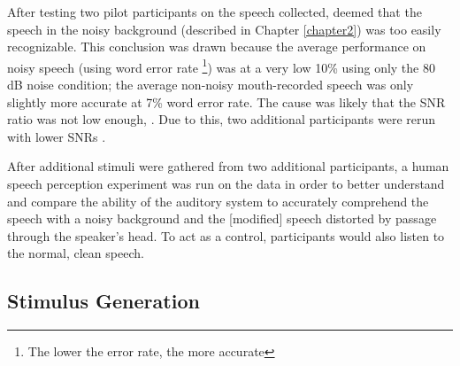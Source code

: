 After testing two pilot participants on the speech collected, \DIFdelbegin {}\DIFdelend \DIFaddbegin {}\DIFaddend deemed that the speech in the noisy background (described in Chapter \DIFdelbegin {}\DIFdelend \ref{chapter2}) was too easily recognizable.  This conclusion was drawn because the average performance on noisy speech (using word error rate \DIFaddbegin {}\DIFaddend \footnote{The lower the error rate, the more accurate}) was at a very low 10\% using only the 80 dB noise condition; the average non-noisy mouth-recorded speech was only slightly more accurate at 7\% word error rate. The cause was likely that the SNR ratio was not low enough, \DIFdelbegin {}\DIFdelend \DIFaddbegin {}\DIFaddend .  Due to this, two additional participants were rerun with lower SNRs \DIFdelbegin {}\DIFdelend \DIFaddbegin {}\DIFaddend .

\DIFdelbegin %



\DIFdelend After additional stimuli were gathered from \DIFaddbegin {}\DIFaddend two additional participants\DIFdelbegin {}\DIFdelend , a human speech perception experiment was run on the data in order to better understand and compare the ability of the auditory system to accurately comprehend the speech with a noisy background and the [modified] speech distorted by passage through the speaker's head.  To act as a control, participants would also listen to the normal, clean speech.

\DIFdelbegin %
\DIFdelend \DIFaddbegin \subsection{Stimulus Generation}
\label{chap3:methods:stimuli}
\DIFaddend 

